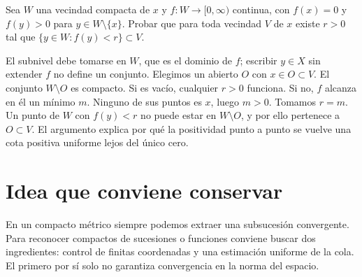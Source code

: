 \begin{ejercicio}
Sea $W$ una vecindad compacta de $x$ y $f:W\to[0,\infty)$ continua, con $f(x)=0$ y $f(y)>0$ para $y\in W\setminus\{x\}$. Probar que para toda vecindad $V$ de $x$ existe $r>0$ tal que $\{y\in W:f(y)<r\}\subset V$.
\end{ejercicio}
\begin{solucion}
El subnivel debe tomarse en $W$, que es el dominio de $f$; escribir $y\in X$ sin extender $f$ no define un conjunto. Elegimos un abierto $O$ con $x\in O\subset V$. El conjunto $W\setminus O$ es compacto. Si es vacío, cualquier $r>0$ funciona. Si no, $f$ alcanza en él un mínimo $m$. Ninguno de sus puntos es $x$, luego $m>0$. Tomamos $r=m$. Un punto de $W$ con $f(y)<r$ no puede estar en $W\setminus O$, y por ello pertenece a $O\subset V$. El argumento explica por qué la positividad punto a punto se vuelve una cota positiva uniforme lejos del único cero.
\end{solucion}

\section{Idea que conviene conservar}
En un compacto métrico siempre podemos extraer una subsucesión convergente. Para reconocer compactos de sucesiones o funciones conviene buscar dos ingredientes: control de finitas coordenadas y una estimación uniforme de la cola. El primero por sí solo no garantiza convergencia en la norma del espacio.
